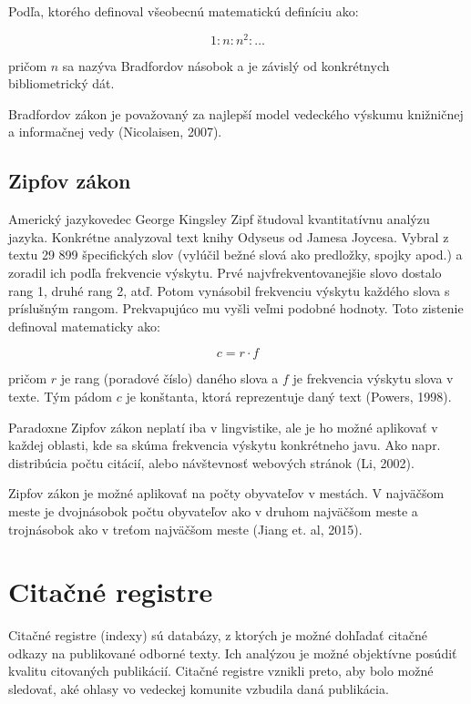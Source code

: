 Podľa, ktorého definoval všeobecnú matematickú definíciu ako:

\begin{equation}
\label{eq:bradfordov_zakon4}
1 : n : n^2 : \dotso
\end{equation}

pričom $n$ sa nazýva Bradfordov násobok a je závislý od konkrétnych
bibliometrický dát.

Bradfordov zákon je považovaný za najlepší model vedeckého výskumu knižničnej a
informačnej vedy (Nicolaisen, 2007).


\subsection{Zipfov zákon}

Americký jazykovedec George Kingsley Zipf študoval kvantitatívnu analýzu jazyka.
Konkrétne analyzoval text knihy Odyseus od Jamesa Joycesa.  Vybral z textu 29
899 špecifických slov (vylúčil bežné slová ako predložky, spojky apod.)  a
zoradil ich podľa frekvencie výskytu.  Prvé najvfrekventovanejšie slovo dostalo
rang 1, druhé rang 2, atď.  Potom vynásobil frekvenciu výskytu každého slova s
príslušným rangom.  Prekvapujúco mu vyšli veľmi podobné hodnoty.  Toto zistenie
definoval matematicky ako:

\begin{equation}
\label{eq:zipfov_zakon}
c = r \cdot f
\end{equation}

pričom $r$ je rang (poradové číslo) daného slova a $f$ je frekvencia výskytu
slova v texte.  Tým pádom $c$ je konštanta, ktorá reprezentuje daný text
(Powers, 1998).


Paradoxne Zipfov zákon neplatí iba v lingvistike, ale je ho možné aplikovať v
každej oblasti, kde sa skúma frekvencia výskytu konkrétneho javu.  Ako
napr. distribúcia počtu citácií, alebo návštevnosť webových stránok (Li, 2002).

Zipfov zákon je možné aplikovať na počty obyvateľov v mestách.  V najväčšom
meste je dvojnásobok počtu obyvateľov ako v druhom najväčšom meste a trojnásobok
ako v treťom najväčšom meste (Jiang et. al, 2015).


\section{Citačné registre}

Citačné registre (indexy) sú databázy, z ktorých je možné dohľadať citačné
odkazy na publikované odborné texty. Ich analýzou je možné objektívne posúdiť
kvalitu citovaných publikácií. Citačné registre vznikli preto, aby bolo možné
sledovať, aké ohlasy vo vedeckej komunite vzbudila daná publikácia.

